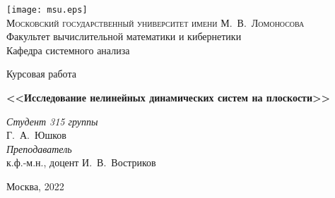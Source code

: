 \documentclass[12pt]{article}
\begin{document}
\thispagestyle{empty}
\begin{center}
\vspace{-3cm}

\texttt{[image: msu.eps]}\\

{\scshape Московский государственный университет имени М.~В.~Ломоносова}\\
Факультет вычислительной математики и кибернетики \\
Кафедра системного анализа

\vfill
{\LARGE Курсовая работа}
\vspace{3cm}

{\Huge\bfseries <<Исследование нелинейных динамических систем на плоскости>>}
\end{center}
\vspace{1cm}
\begin{flushright}
\large
\textit{Студент 315 группы}\\
Г.~А.~Юшков \\
\vspace{5mm}
\textit{Преподаватель}\\
к.ф.-м.н., доцент И.~В.~Востриков
\end{flushright}
\vfill
\begin{center}
Москва, 2022
\end{center}
\makeatother

\newpage
\tableofcontents

\newpage
\end{document}
